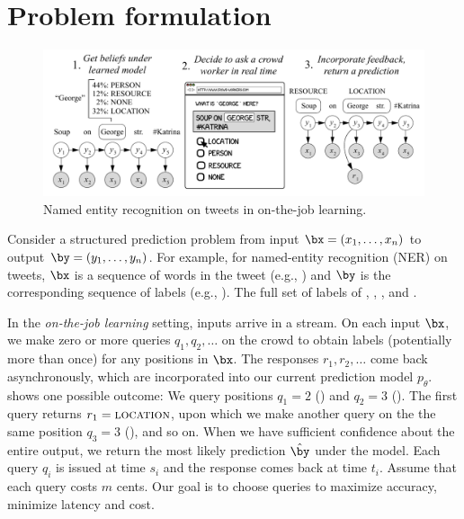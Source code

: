 \section{Problem formulation}
\label{sec:model}

\begin{figure}[t]
  \begin{centering}
  \includegraphics[width=1.0\textwidth]{figures/intro-banner.pdf}
  \end{centering}
  \caption{
    Named entity recognition on tweets in on-the-job learning.
}
\label{fig:crf}
\end{figure}

Consider a structured prediction problem from input $\bx = (x_1, \dots, x_n)$ to output $\by = (y_1, \dots, y_n)$.
For example, for named-entity recognition (NER) on tweets,
$\bx$ is a sequence of words in the tweet (e.g., )
and $\by$ is the corresponding sequence of labels (e.g., \scnone{} \scloc{} \scloc{}).
The full set of labels of \scper{}, \scloc{}, \scres{}, and \scnone{}.

In the \emph{on-the-job learning} setting, inputs arrive in a stream.
On each input $\bx$,
we make zero or more queries $q_1, q_2, \dots$ on the crowd to obtain labels
(potentially more than once)
for any positions in $\bx$.
The responses $r_1, r_2, \dots$ come back asynchronously,
which are incorporated into our current prediction model $p_\theta$.
 shows one possible outcome:
We query positions $q_1 = 2$ () and $q_2=3$ ().
The first query returns $r_1 = \textsc{location}$,
upon which we make another query on the the same position $q_3 = 3$ (),
and so on.
When we have sufficient confidence about the entire output,
we return the most likely prediction $\hat \by$ under the model.
Each query $q_i$ is issued at time $s_i$ and the response comes back at time $t_i$.
Assume that each query costs $m$ cents.
Our goal is to choose queries to maximize accuracy, minimize latency and cost.

